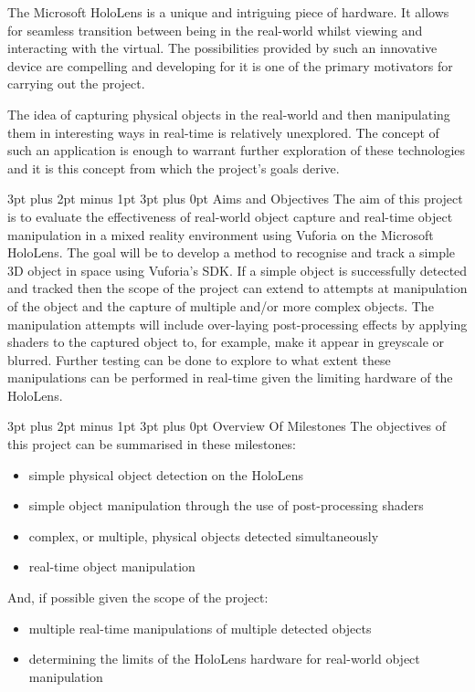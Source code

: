 \documentclass[12pt,a4paper]{article}
\makeatletter
\renewcommand\subsubsection{\@startsection {subsubsection}{1}{0mm} %
	                           {3pt plus 2pt minus 1pt} %
	                           {3pt plus 0pt} %
	                           {\normalfont\bfseries}}
\renewcommand\subsection{\@startsection {subsection}{1}{0mm} %
                               {3pt plus 2pt minus 1pt} %
                               {3pt plus 0pt} %
                               {\large\bfseries}}
\makeatother
\begin{document}
The Microsoft HoloLens is a unique and intriguing piece of hardware. It allows for seamless transition between being in the real-world whilst viewing and interacting with the virtual. The possibilities provided by such an innovative device are compelling and developing for it is one of the primary motivators for carrying out the project.

The idea of capturing physical objects in the real-world and then manipulating them in interesting ways in real-time is relatively unexplored. The concept of such an application is enough to warrant further exploration of these technologies and it is this concept from which the project's goals derive.

\subsection{Aims and Objectives}
The aim of this project is to evaluate the effectiveness of real-world object capture and real-time object manipulation in a mixed reality environment using Vuforia on the Microsoft HoloLens. The goal will be to develop a method to recognise and track a simple 3D object in space using Vuforia's SDK. If a simple object is successfully detected and tracked then the scope of the project can extend to attempts at manipulation of the object and the capture of multiple and/or more complex objects. The manipulation attempts will include over-laying post-processing effects by applying shaders to the captured object to, for example, make it appear in greyscale or blurred. Further testing can be done to explore to what extent these manipulations can be performed in real-time given the limiting hardware of the HoloLens.

\subsubsection{Overview Of Milestones}
The objectives of this project can be summarised in these milestones:
\begin{itemize}\itemsep0pt
	\item simple physical object detection on the HoloLens
	\item simple object manipulation through the use of post-processing shaders
	\item complex, or multiple, physical objects detected simultaneously
	\item real-time object manipulation
\end{itemize}
And, if possible given the scope of the project:
\begin{itemize}\itemsep0pt
	\item multiple real-time manipulations of multiple detected objects
	\item determining the limits of the HoloLens hardware for real-world object manipulation
\end{itemize}
\end{document}
